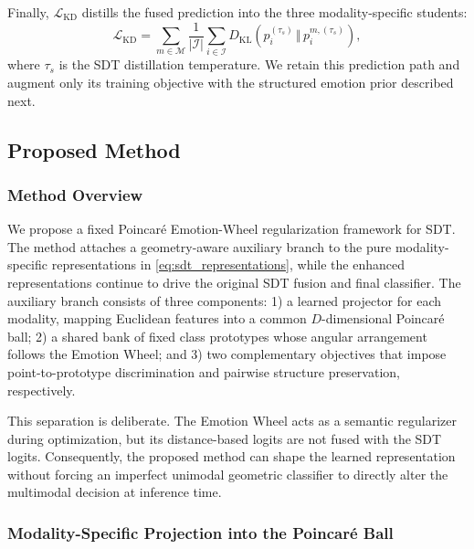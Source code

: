\documentclass[letterpaper,journal]{IEEEtran}
\begin{document}
Finally, \(\mathcal{L}_{\mathrm{KD}}\) distills the fused prediction into the
three modality-specific students:
\begin{equation}
    \mathcal{L}_{\mathrm{KD}}
    =\sum_{m\in\mathcal{M}}
    \frac{1}{|\mathcal{I}|}
    \sum_{i\in\mathcal{I}}
    D_{\mathrm{KL}}\!\left(
    p_i^{(\tau_s)}\,\Vert\,p_i^{m,(\tau_s)}\right),
    \label{eq:sdt_kd_loss}
\end{equation}
where \(\tau_s\) is the SDT distillation temperature. We retain this prediction
path and augment only its training objective with the structured emotion prior
described next.

\subsection{Proposed Method}
\label{subsec:proposed_method}

\subsubsection{Method Overview}

We propose a fixed Poincar\'e Emotion-Wheel regularization framework for SDT.
The method attaches a geometry-aware auxiliary branch to the pure
modality-specific representations in \eqref{eq:sdt_representations}, while the
enhanced representations continue to drive the original SDT fusion and final
classifier. The auxiliary branch consists of three components: 1) a learned
projector for each modality, mapping Euclidean features into a common
\(D\)-dimensional Poincar\'e ball; 2) a shared bank of fixed class prototypes
whose angular arrangement follows the Emotion Wheel; and 3) two complementary
objectives that impose point-to-prototype discrimination and pairwise
structure preservation, respectively.

This separation is deliberate. The Emotion Wheel acts as a semantic
regularizer during optimization, but its distance-based logits are not fused
with the SDT logits. Consequently, the proposed method can shape the learned
representation without forcing an imperfect unimodal geometric classifier to
directly alter the multimodal decision at inference time.

\subsubsection{Modality-Specific Projection into the Poincar\'e Ball}
\end{document}
